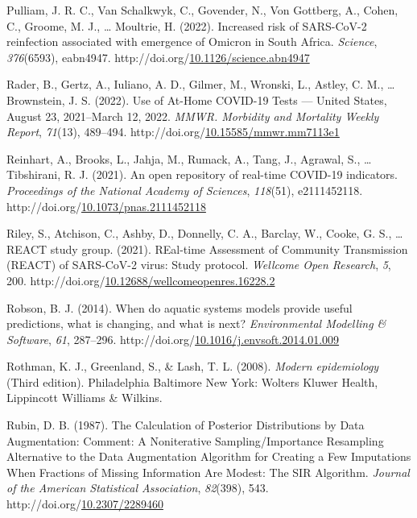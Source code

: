\documentclass[12pt,twoside]{smiththesis}
\newlength{\cslhangindent}
\newenvironment{CSLReferences}[2] %
 {%
\setlength{\parindent}{0pt}
\ifodd #1 \everypar{\setlength{\hangindent}{\cslhangindent}}\ignorespaces\fi
\ifnum #2 > 0
\setlength{\parskip}{#2\baselineskip}
  \fi
}%
{}
\begin{document}
\begin{CSLReferences}{1}{0}
\leavevmode{}%
Pulliam, J. R. C., Van Schalkwyk, C., Govender, N., Von Gottberg, A., Cohen, C., Groome, M. J., \ldots{} Moultrie, H. (2022). Increased risk of {SARS-CoV-2} reinfection associated with emergence of {Omicron} in {South Africa}. \emph{Science}, \emph{376}(6593), eabn4947. http://doi.org/\href{https://doi.org/10.1126/science.abn4947}{10.1126/science.abn4947}

\leavevmode{}%
Rader, B., Gertz, A., Iuliano, A. D., Gilmer, M., Wronski, L., Astley, C. M., \ldots{} Brownstein, J. S. (2022). Use of {At-Home COVID-19 Tests} --- {United States}, {August} 23, 2021--{March} 12, 2022. \emph{MMWR. Morbidity and Mortality Weekly Report}, \emph{71}(13), 489--494. http://doi.org/\href{https://doi.org/10.15585/mmwr.mm7113e1}{10.15585/mmwr.mm7113e1}

\leavevmode{}%
Reinhart, A., Brooks, L., Jahja, M., Rumack, A., Tang, J., Agrawal, S., \ldots{} Tibshirani, R. J. (2021). An open repository of real-time {COVID-19} indicators. \emph{Proceedings of the National Academy of Sciences}, \emph{118}(51), e2111452118. http://doi.org/\href{https://doi.org/10.1073/pnas.2111452118}{10.1073/pnas.2111452118}

\leavevmode{}%
Riley, S., Atchison, C., Ashby, D., Donnelly, C. A., Barclay, W., Cooke, G. S., \ldots{} REACT study group. (2021). {REal-time Assessment} of {Community Transmission} ({REACT}) of {SARS-CoV-2} virus: {Study} protocol. \emph{Wellcome Open Research}, \emph{5}, 200. http://doi.org/\href{https://doi.org/10.12688/wellcomeopenres.16228.2}{10.12688/wellcomeopenres.16228.2}

\leavevmode{}%
Robson, B. J. (2014). When do aquatic systems models provide useful predictions, what is changing, and what is next? \emph{Environmental Modelling \& Software}, \emph{61}, 287--296. http://doi.org/\href{https://doi.org/10.1016/j.envsoft.2014.01.009}{10.1016/j.envsoft.2014.01.009}

\leavevmode{}%
Rothman, K. J., Greenland, S., \& Lash, T. L. (2008). \emph{Modern epidemiology} (Third edition). {Philadelphia Baltimore New York}: {Wolters Kluwer Health, Lippincott Williams \& Wilkins}.

\leavevmode{}%
Rubin, D. B. (1987). The {Calculation} of {Posterior Distributions} by {Data Augmentation}: {Comment}: {A Noniterative Sampling}/{Importance Resampling Alternative} to the {Data Augmentation Algorithm} for {Creating} a {Few Imputations When Fractions} of {Missing Information Are Modest}: {The SIR Algorithm}. \emph{Journal of the American Statistical Association}, \emph{82}(398), 543. http://doi.org/\href{https://doi.org/10.2307/2289460}{10.2307/2289460}


\end{CSLReferences}
\end{document}
